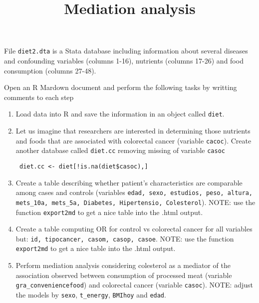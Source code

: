 \documentclass[11pt]{article}
\begin{document}
\title{\bf Mediation analysis}
\date{}


\maketitle




 File {\tt diet2.dta} is a Stata database including information about several diseases and confounding variables (columns 1-16), nutrients (columns 17-26) and food consumption (columns 27-48). 

\smallskip

\noindent Open an R Mardown document and perform the following tasks by writting comments to each step
 
\begin{enumerate}
 \item Load data into R and save the information in an object called {\tt diet}.
 \item Let us imagine that researchers are interested in determining those nutrients and foods that are associated with colorectal cancer (variable {\tt cacoc}). Create another database called {\tt diet.cc} removing missing of variable {\tt casoc}
 
 \begin{verbatim}
 diet.cc <- diet[!is.na(diet$casoc),]
 \end{verbatim}
 
  \item Create a table describing whether patient's characteristics are comparable among cases and controls (variables {\tt edad,  sexo, estudios, peso, altura, mets\_10a, mets\_5a, Diabetes, Hipertensio, Colesterol}). NOTE: use the function {\tt export2md} to get a nice table into the .html output.  
  
 \item Create a table computing OR for control vs colorectal cancer for all variables but: {\tt id, tipocancer, casom, casop, casoe}. NOTE: use the function {\tt export2md} to get a nice table into the .html output. 
 
 \item Perform mediation analysis considering colesterol as a mediator of the association observed between consumption of processed meat (variable {\tt gra\_conveniencefood}) and colorectal cancer (variable {\tt casoc}). NOTE: adjust the models by {\tt sexo}, {\tt t\_energy}, {\tt BMIhoy} and {\tt edad}.
 \end{enumerate}
\end{document}

